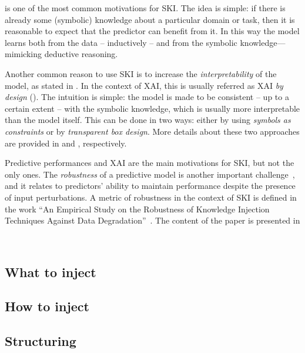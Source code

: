  is one of the most common motivations for \gls{SKI}.
%
The idea is simple: if there is already some (symbolic) knowledge about a particular domain or task, then it is reasonable to expect that the predictor can benefit from it.
%
In this way the model learns both from the data -- inductively -- and from the symbolic knowledge---mimicking deductive reasoning.


Another common reason to use \gls{SKI} is to increase the \emph{interpretability} of the model, as stated in .
%
In the context of \gls{XAI}, this is usually referred as \gls{XAI} \emph{by design} ().
%
The intuition is simple: the model is made to be consistent -- up to a certain extent -- with the symbolic knowledge, which is usually more interpretable than the model itself.
%
This can be done in two ways: either by using \emph{symbols as constraints} or by \emph{transparent box design}.
%
More details about these two approaches are provided in  and , respectively.


Predictive performances and \gls{XAI} are the main motivations for \gls{SKI}, but not the only ones.
%
The \emph{robustness} of a predictive model is another important challenge~\cite{DBLP:conf/eccv/LiuCZH18}, and it relates to predictors' ability to maintain performance despite the presence of input perturbations.
%
A metric of robustness in the context of \gls{SKI} is defined in the work ``An Empirical Study on the Robustness of Knowledge Injection Techniques Against Data Degradation''~\cite{DBLP:conf/woa/RafanelliMACO24}.
%
The content of the paper is presented in
%


~\cite{DBLP:journals/aamas/AgiolloRMCO23}

\subsection{What to inject}\label{subsec:what-to-inject}

\subsection{How to inject}\label{subsec:how-to-inject}

\subsection{Structuring}\label{subsec:structuring}

